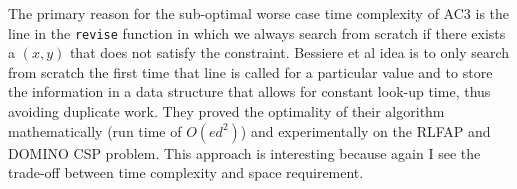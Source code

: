 \documentclass[9.5pt]{extarticle}
\begin{document}
The primary reason for the sub-optimal worse case time complexity of AC3 is the line in the \verb`revise` function in which we always search from scratch if there exists a $(x,y)$ that does not satisfy the constraint. Bessiere et al idea is to only search from scratch the first time that line is called for a particular value and to store the information in a data structure that allows for constant look-up time, thus avoiding duplicate work. They proved the optimality of their algorithm mathematically (run time of $O(ed^2)$) and experimentally on the RLFAP and DOMINO CSP problem. This approach is interesting because again I see the trade-off between time complexity and space requirement.
\end{document}
